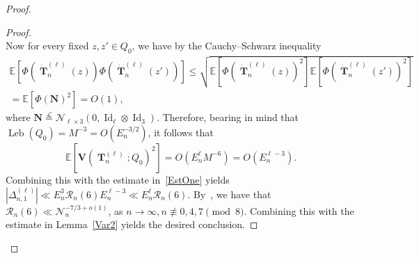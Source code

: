 \documentclass[AHL,Unicode,longabstracts,published]{cedram}
\DeclareMathOperator{\Leb}{Leb}
\DeclareMathOperator{\Id}{Id}
\DeclareMathOperator{\bT}{\mathbf{T}}
\newcommand{\scN}{\mathscr{N}}
\newcommand{\bfv}{\mathbf{V}}
\newcommand{\bfN}{\mathbf{N}}
\newcommand{\clR}{\mathcal{R}}
\newcommand{\E}[1]{\mathbb{E}\left[#1\right]}
\newcommand{\eqLaw}{ \overset{\mathcal{L}}{=} }
\newcommand{\notcon}[3]{ {#1} \not\equiv {#2} \pmod {#3} }
\newcommand{\Nn}{\mathcal{N}_n}
\begin{document}
\begin{proof}
\begin{proof}
\[\]
Now for every fixed $z,z'\in Q_0$, we have by the Cauchy--Schwarz inequality
\begin{multline*}
\E{ \Phi\left(\dot{\bT}_n^{(\ell)}(z)\right) \Phi\left(\dot{\bT}_n^{(\ell)}(z')\right) }
\leq \sqrt{\E{ \Phi\left(\dot{\bT}_n^{(\ell)}(z)\right)^2} \E{ \Phi\left(\dot{\bT}_n^{(\ell)}(z')\right)^2 }}\\ =\E{\Phi(\bfN)^2}= O(1),
\end{multline*}
where $\bfN \eqLaw \scN_{\ell \times 3}(0, \Id_{\ell}\otimes \Id_3)$. Therefore, bearing in mind that $\Leb(Q_0)=M^{-3}=O(E_n^{-3/2})$, it follows that
\[
\E{\bfv\left(\bT_n^{(\ell)};Q_0\right)^2} = O\left(E_n^{\ell}M^{-6}\right) = O\left(E_n^{\ell-3}\right).
\]
Combining this with the estimate in~\eqref{EstOne} yields $|\Delta_{n,1}^{(\ell)}| \ll E_n^3 \clR_n(6) E_n^{\ell-3} \ll E_n^{\ell} \clR_n(6)$. By~\cite[Eq.~(1.18)]{BM17}, we have that $\clR_n(6) \ll \Nn^{-7/3+o(1)}$, as $ n\to\infty,\notcon{n}{0,4,7}{8}$. Combining this with the estimate in Lemma~\ref{Var2} yields the desired conclusion.
\end{proof}




\end{proof}
\end{document}
